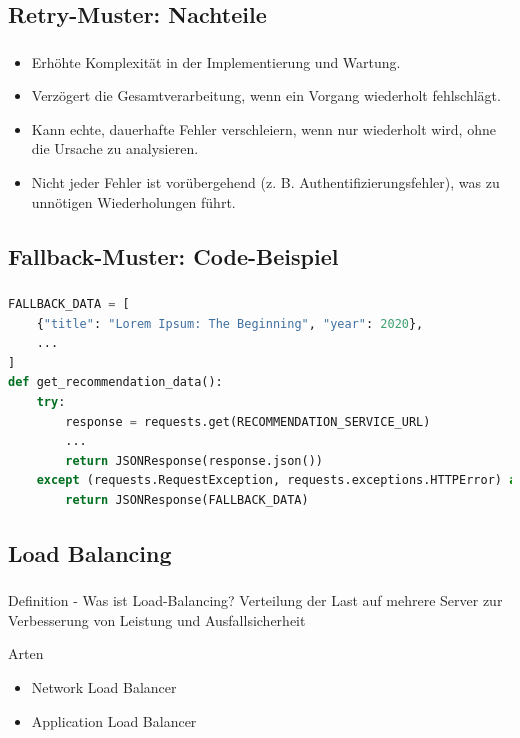 \subsection{Retry-Muster: Nachteile}
\begin{frame}
    \frametitle{\insertsection}
    \framesubtitle{\insertsubsection}

    \begin{itemize}
        \item Erhöhte Komplexität in der Implementierung und Wartung.
        \item Verzögert die Gesamtverarbeitung, wenn ein Vorgang wiederholt fehlschlägt.
        \item Kann echte, dauerhafte Fehler verschleiern, wenn nur wiederholt wird, ohne die Ursache zu analysieren.
        \item Nicht jeder Fehler ist vorübergehend (z. B. Authentifizierungsfehler), was zu unnötigen Wiederholungen führt.
    \end{itemize}
\end{frame}

\subsection{\textbf{Fallback-Muster: Code-Beispiel}}

\begin{frame}[fragile]
    \frametitle{\insertsection}
    \framesubtitle{\insertsubsection}


    \begin{lstlisting}[language=Python]
FALLBACK_DATA = [
    {"title": "Lorem Ipsum: The Beginning", "year": 2020},
    ...
]
def get_recommendation_data():
    try:
        response = requests.get(RECOMMENDATION_SERVICE_URL)
        ...
        return JSONResponse(response.json())
    except (requests.RequestException, requests.exceptions.HTTPError) as e:
        return JSONResponse(FALLBACK_DATA)
    \end{lstlisting}
\end{frame}


\subsection{\textbf{Load Balancing}}
\begin{frame}
    \frametitle{\insertsection}
    \framesubtitle{\insertsubsection}
    \begin{block}{Definition - Was ist Load-Balancing?}
        Verteilung der Last auf mehrere Server zur Verbesserung von Leistung und Ausfallsicherheit
    \end{block}
    \begin{block}{Arten}
        \begin{itemize}
       		\item Network Load Balancer
       		\item Application Load Balancer
         \end{itemize}
    \end{block}
\end{frame}

